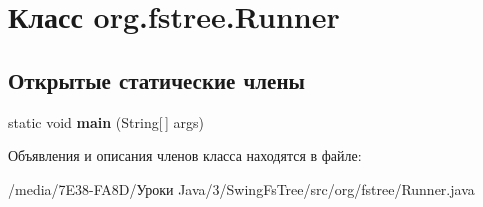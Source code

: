\hypertarget{classorg_1_1fstree_1_1_runner}{
\section{Класс org.fstree.Runner}
\label{classorg_1_1fstree_1_1_runner}
}
\subsection*{Открытые статические члены}
\begin{DoxyCompactItemize}
\item 
\hypertarget{classorg_1_1fstree_1_1_runner_adcc946b1e9ff4960e4b1735f1d60dd4e}{
static void {\bfseries main} (String\mbox{[}$\,$\mbox{]} args)}
\label{classorg_1_1fstree_1_1_runner_adcc946b1e9ff4960e4b1735f1d60dd4e}

\end{DoxyCompactItemize}


Объявления и описания членов класса находятся в файле:\begin{DoxyCompactItemize}
\item 
/media/7E38-\/FA8D/Уроки Java/3/SwingFsTree/src/org/fstree/Runner.java\end{DoxyCompactItemize}
